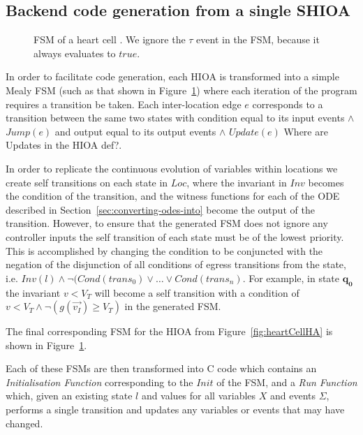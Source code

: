 \subsection{Backend code generation from a single \ac{SHIOA}}
\label{sec:backendCodeGeneration}

\begin{figure}
  \centering
  
  \caption{\acf{FSM} of a heart cell \label{fig:heartCellFSM}. We ignore
    the $\tau$ event in the \ac{FSM}, because it always evaluates to $true$.}
\end{figure}

In order to facilitate code generation, each \ac{HIOA} is transformed into a 
simple Mealy \ac{FSM} (such as that shown in Figure~\ref{fig:heartCellFSM}) 
where each iteration of the program requires a transition be taken.  Each 
inter-location edge $e$ corresponds to a transition between the same two states 
with condition equal to its input events $\wedge$ $Jump(e)$ and output equal to 
its output events $\wedge$ $Update(e)$ {\color{red} Where are Updates in the 
HIOA def?}.

In order to replicate the continuous evolution of variables within locations we 
create self transitions on each state in $Loc$, where the invariant in $Inv$ 
becomes the condition of the transition, and the witness functions for each of 
the \acs{ODE} described in Section~\ref{sec:converting-odes-into} become the 
output of the transition. However, to ensure that the generated \ac{FSM} does 
not ignore any controller inputs the self transition of each state must be of 
the lowest priority.  This is accomplished by changing the condition to be 
conjuncted with the negation of the disjunction of all conditions of egress 
transitions from the state, i.e. $Inv(l) \wedge \neg (Cond(trans_{0}) \vee 
\dots \vee Cond(trans_{n})$.  For example, in state $\mathbf{q_0}$ the 
invariant $v < V_{T}$ will become a self transition with a condition of $v < 
V_{T} \wedge \neg (g(\vec{v_{I}}) \geq V_{T})$ in the generated \ac{FSM}.

The final corresponding \ac{FSM} for the \ac{HIOA} from 
Figure~\ref{fig:heartCellHA} is shown in Figure~\ref{fig:heartCellFSM}.

Each of these \acp{FSM} are then transformed into C code which contains an 
\emph{Initialisation Function} corresponding to the $Init$ of the \ac{FSM}, and 
a \emph{Run Function} which, given an existing state $l$ and values for all 
variables $X$ and events $\Sigma$, performs a single transition and updates any 
variables or events that may have changed.
